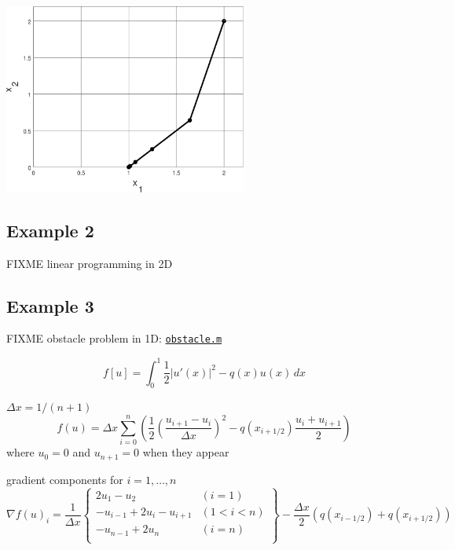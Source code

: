 \documentclass[11pt]{article}
\newcommand{\grad}{\nabla}
\begin{document}
\bigskip
\begin{center}
\includegraphics[width=0.6\textwidth]{testpopdip}
\end{center}


\subsection*{Example 2}

FIXME linear programming in 2D


\subsection*{Example 3}

FIXME obstacle problem in 1D: \href{https://github.com/bueler/popdip/blob/main/matlab/obstacle.m}{\texttt{obstacle.m}}

\begin{equation}
    f[u] = \int_0^1 \frac{1}{2} |u'(x)|^2 - q(x) u(x)\,dx \label{obstaclefunctional}
\end{equation}

$\Delta x = 1 / (n+1)$
\begin{equation}
    f(u) = \Delta x \sum_{i=0}^n \left(\frac{1}{2} \left(\frac{u_{i+1}-u_i}{\Delta x}\right)^2 - q(x_{i+1/2}) \frac{u_i + u_{i+1}}{2}\right) \label{obstacleobjective}
\end{equation}
where $u_0=0$ and $u_{n+1}=0$ when they appear

gradient components for $i=1,\dots,n$
\begin{equation}
\grad f(u)_i = \frac{1}{\Delta x} \left\{\begin{matrix}
2 u_1 - u_2 & (i=1) \\
-u_{i-1} + 2 u_i - u_{i+1} & (1<i<n) \\
-u_{n-1} + 2 u_n & (i=n) \\
\end{matrix} \right\} - \frac{\Delta x}{2} (q(x_{i-1/2}) + q(x_{i+1/2}))
\end{equation}
\end{document}
